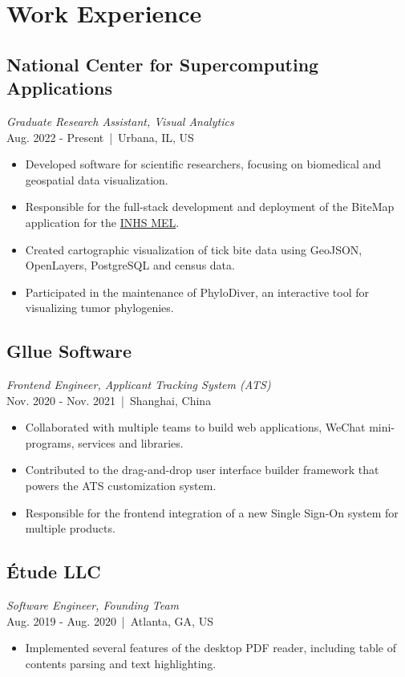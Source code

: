 \documentclass[11pt]{article}
\begin{document}
\begin{minipage}{280pt}

\section*{\sc Work Experience}

\subsection*{National Center for Supercomputing Applications}
\textit{Graduate Research Assistant, Visual Analytics} \\
Aug. 2022 - Present \,|\, Urbana, IL, US\\
\begin{itemize}
\item Developed software for scientific researchers, focusing on biomedical and geospatial data visualization.
\item Responsible for the full-stack development and deployment of the BiteMap application for the \href{https://medical-entomology.inhs.illinois.edu/}{INHS MEL}.
\item Created cartographic visualization of tick bite data using GeoJSON, OpenLayers, PostgreSQL and census data.
\item Participated in the maintenance of PhyloDiver, an interactive tool for visualizing tumor phylogenies.
\end{itemize}

\subsection*{Gllue Software}
\textit{Frontend Engineer, Applicant Tracking System (ATS)}\\
Nov. 2020 - Nov. 2021 \,|\, Shanghai, China\\
\begin{itemize}
\item Collaborated with multiple teams to build web applications, WeChat mini-programs, services and libraries.
\item Contributed to the drag-and-drop user interface builder framework that powers the ATS customization system.
\item Responsible for the frontend integration of a new Single Sign-On system for multiple products.
\end{itemize}

\subsection*{Étude LLC}
\textit{Software Engineer, Founding Team}\\
Aug. 2019 - Aug. 2020 \,|\,  Atlanta, GA, US\\
\begin{itemize}
\item Implemented several features of the desktop PDF reader, including table of contents parsing and text highlighting.
\end{itemize}


\end{minipage}
\end{document}
